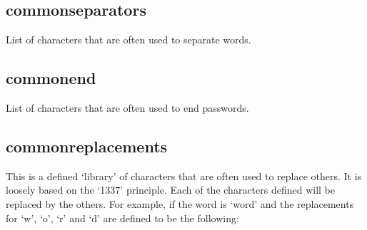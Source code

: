 \documentclass[letterpaper,10pt,english]{sphinxmanual}
\begin{document}
\subsection{common\sphinxhyphen{}separators}
\label{\detokenize{usage:common-separators}}

\begin{fulllineitems}
\sphinxAtStartPar
List of characters that are often used to separate words.

\begin{sphinxVerbatim}[commandchars=\\\{\}]
  \PYG{p}{[}
    
 \PYG{p}{]}
\end{sphinxVerbatim}

\end{fulllineitems}



\subsection{common\sphinxhyphen{}end}
\label{\detokenize{usage:common-end}}

\begin{fulllineitems}
\sphinxAtStartPar
List of characters that are often used to end passwords.

\begin{sphinxVerbatim}[commandchars=\\\{\}]
  \PYG{p}{[}
     
 \PYG{p}{]}
\end{sphinxVerbatim}

\end{fulllineitems}



\subsection{common\sphinxhyphen{}replacements}
\label{\detokenize{usage:common-replacements}}
\sphinxAtStartPar
This is a defined ‘library’ of characters that are often used to replace others. It is loosely based on the ‘1337’ principle. Each of the characters defined will be replaced by the others. For example, if the word is ‘word’ and the replacements for ‘w’, ‘o’, ‘r’ and ‘d’ are defined to be the following:
\end{document}
